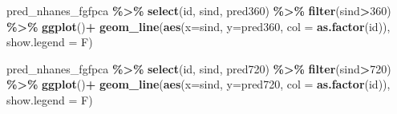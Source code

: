\documentclass[
]{article}
\newenvironment{Shaded}{\begin{snugshade}}{\end{snugshade}}
\newcommand{\AttributeTok}[1]{\textcolor[rgb]{0.13,0.29,0.53}{#1}}
\newcommand{\DecValTok}[1]{\textcolor[rgb]{0.00,0.00,0.81}{#1}}
\newcommand{\FunctionTok}[1]{\textcolor[rgb]{0.13,0.29,0.53}{\textbf{#1}}}
\newcommand{\NormalTok}[1]{#1}
\newcommand{\SpecialCharTok}[1]{\textcolor[rgb]{0.81,0.36,0.00}{\textbf{#1}}}
\begin{document}
\begin{Shaded}
\begin{Highlighting}[]
\NormalTok{pred\_nhanes\_fgfpca }\SpecialCharTok{\%\textgreater{}\%}
  \FunctionTok{select}\NormalTok{(id, sind, pred360) }\SpecialCharTok{\%\textgreater{}\%}
  \FunctionTok{filter}\NormalTok{(sind}\SpecialCharTok{\textgreater{}}\DecValTok{360}\NormalTok{) }\SpecialCharTok{\%\textgreater{}\%}
  \FunctionTok{ggplot}\NormalTok{()}\SpecialCharTok{+}
  \FunctionTok{geom\_line}\NormalTok{(}\FunctionTok{aes}\NormalTok{(}\AttributeTok{x=}\NormalTok{sind, }\AttributeTok{y=}\NormalTok{pred360, }\AttributeTok{col =} \FunctionTok{as.factor}\NormalTok{(id)), }\AttributeTok{show.legend =}\NormalTok{ F)}

\NormalTok{pred\_nhanes\_fgfpca }\SpecialCharTok{\%\textgreater{}\%}
  \FunctionTok{select}\NormalTok{(id, sind, pred720) }\SpecialCharTok{\%\textgreater{}\%}
  \FunctionTok{filter}\NormalTok{(sind}\SpecialCharTok{\textgreater{}}\DecValTok{720}\NormalTok{) }\SpecialCharTok{\%\textgreater{}\%}
  \FunctionTok{ggplot}\NormalTok{()}\SpecialCharTok{+}
  \FunctionTok{geom\_line}\NormalTok{(}\FunctionTok{aes}\NormalTok{(}\AttributeTok{x=}\NormalTok{sind, }\AttributeTok{y=}\NormalTok{pred720, }\AttributeTok{col =} \FunctionTok{as.factor}\NormalTok{(id)), }\AttributeTok{show.legend =}\NormalTok{ F)}
\end{Highlighting}
\end{Shaded}
\end{document}
